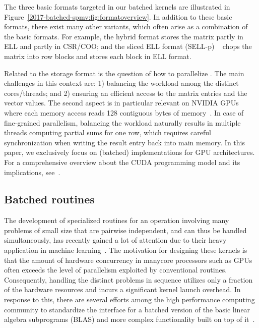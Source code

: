 The three basic formats targeted in our batched kernels are illustrated
in Figure~\ref{2017-batched-spmv:fig:formatoverview}. In addition to these basic formats, there exist many other variants,
which often arise as a combination of the basic formats.
For example, the hybrid format stores the matrix partly in ELL and partly in CSR/COO; 
and the sliced ELL format (SELL-p) ~\cite{sellcs} chops the matrix into row blocks and stores each block in ELL
format.


Related to the storage format is the question of how to parallelize
\spmv.
The main challenges in this context are: 
1) balancing the workload among the distinct cores/threads; and 
2) ensuring an efficient access to the matrix entries and the vector values.
The second aspect is in particular relevant on NVIDIA GPUs where each memory access
reads 128 contiguous bytes of memory~\cite{cuda8.0}.
In case of fine-grained parallelism, balancing the workload naturally results in 
multiple threads computing partial sums for one row, which requires careful synchronization
when writing the result entry back into main memory.
In this paper, we exclusively focus on (batched) \spmv implementations for 
GPU architectures. For a comprehensive overview about
the CUDA programming model and its implications, see~\cite{cuda8.0,lawn2016}.

\label{2017-batched-spmv:sec:s2-related}
\subsection{Batched routines}

The development of specialized routines for an operation involving many
problems
of small size that are pairwise independent, and can thus be handled simultaneously, 
has recently gained a lot of attention
due to their heavy application in machine learning~\cite{Abdelfattah2016}.
The motivation for designing these kernels is that the amount of hardware concurrency
in manycore processors such as GPUs
often exceeds the level of parallelism exploited by conventional routines.
Consequently, handling the distinct problems in sequence
utilizes only a fraction of the hardware resources and incurs a significant kernel launch overhead.
In response to this, there are several
efforts among the high performance computing community to
standardize the interface for a batched version of the basic linear algebra subprograms (BLAS)
and more complex functionality built on top of it~\cite{bblas}.
